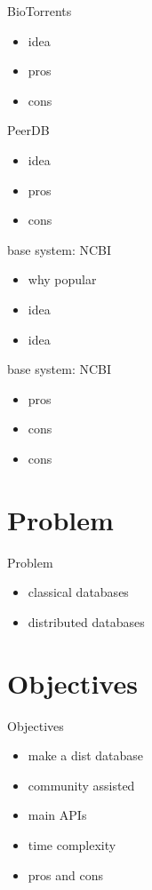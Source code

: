 \documentclass{beamer}
\begin{document}
\begin{frame}{BioTorrents}
  \begin{itemize}   
    \item idea
    \item pros
    \item cons
  \end{itemize}
\end{frame}

\begin{frame}{PeerDB}
  \begin{itemize}   
    \item idea
    \item pros
    \item cons
  \end{itemize}
\end{frame}

\begin{frame}{base system: NCBI}
  \begin{itemize}   
    \item why popular
    \item idea
    \item idea
  \end{itemize}
\end{frame}

\begin{frame}{base system: NCBI}
  \begin{itemize}   
    \item pros
    \item cons
    \item cons
  \end{itemize}
\end{frame}

\section{Problem}
\begin{frame}{Problem}
  \begin{itemize}   
    \item classical databases
    \item distributed databases
  \end{itemize}
\end{frame}

\section{Objectives}
\begin{frame}{Objectives}
  \begin{itemize}   
    \item make a dist database
    \item community assisted
    \item main APIs
    \item time complexity
    \item pros and cons
  \end{itemize}
\end{frame}
\end{document}
